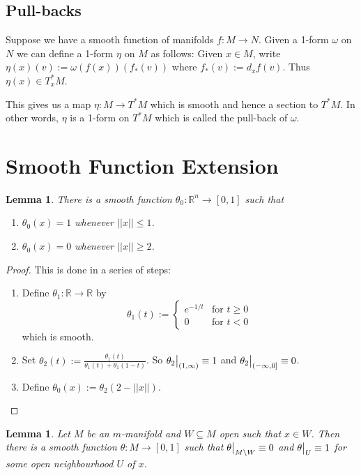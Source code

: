 \documentclass[11pt]{article}
\newcommand{\defeq}{:=}
\newcommand{\norm}[1]{||#1||}
\newcommand\restr[2]{{%
  \left.\kern-\nulldelimiterspace %
  #1 %
  \vphantom{\big|} %
  \right|_{#2} %
  }}
\newcommand{\R}{\mathbb{R}}
\newcommand{\mdf}[1]{{\color{RoyalBlue} #1}}
\newtheorem{lemma}[theorem]{Lemma}
\begin{document}
\subsection{Pull-backs}
Suppose we have a smooth function of manifolds $f:M \to N$.
Given a 1-form $\omega$ on $N$ we can define a 1-form $\eta$ on $M$ as follows:
Given $x\in M$, write $\eta(x)(v)\defeq\omega(f(x))(f_\ast(v))$ where $f_\ast(v)\defeq d_xf (v)$.
Thus $\eta(x)\in T_x^\ast M$.

This gives us a map $\eta: M \to T^\ast M$ which is smooth and hence a section to $T^\ast M$.
In other words, $\eta$ is a 1-form on $T^\ast M$ which is called the \mdf{pull-back} of $\omega$.

\section{Smooth Function Extension}

\begin{lemma}
There is a smooth function $\theta_0: \R^n \to [0, 1]$ such that
\begin{enumerate}
	\item $\theta_0(x) = 1$ whenever $\norm{x} \leq 1$.
	\item $\theta_0(x) = 0$ whenever $\norm{x} \geq 2$.
\end{enumerate}
\end{lemma}

\begin{proof}
This is done in a series of steps:
\begin{enumerate}
	\item Define $\theta_1: \R \to \R$ by
		\[
			\theta_1(t) \defeq
			\begin{cases}
				e^{-1/t} & \text{for }t\geq 0 \\
				0 		& \text{for } t< 0
			\end{cases}
		\]
		which is smooth.

	\item Set $\theta_2(t) \defeq \frac{\theta_1(t)}{\theta_1(t) + \theta_1(1-t)}$.
		So $\restr{\theta_2}{(1, \infty)} \equiv 1$ and $\restr{\theta_2}{(-\infty, 0]}\equiv 0$.
	\item Define $\theta_0(x) \defeq \theta_2(2- \norm{x})$.
\end{enumerate}
\end{proof}

\begin{lemma}
Let $M$ be an $m$-manifold and $W\subseteq M$ open such that $x\in W$.
Then there is a smooth function $\theta: M\to [0, 1]$ such that $\restr{\theta}{M\setminus W}\equiv 0$ and $\restr{\theta}{U}\equiv 1$ for some open neighbourhood $U$ of $x$.
\end{lemma}
\end{document}
